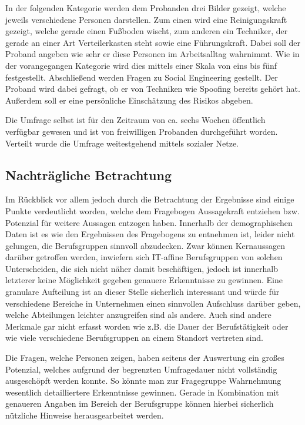 In der folgenden Kategorie werden dem Probanden drei Bilder gezeigt, welche jeweils verschiedene Personen darstellen.
Zum einen wird eine Reinigungskraft gezeigt, welche gerade einen Fußboden wischt, zum anderen ein Techniker, der gerade an einer Art Verteilerkasten steht sowie eine Führungskraft.
Dabei soll der Proband angeben wie sehr er diese Personen im Arbeitsalltag wahrnimmt.
Wie in der vorangegangen Kategorie wird dies mittels einer Skala von eins bis fünf festgestellt.
Abschließend werden Fragen zu Social Engineering gestellt.
Der Proband wird dabei gefragt, ob er von Techniken wie Spoofing bereits gehört hat.
Außerdem soll er eine persönliche Einschätzung des Risikos abgeben.

Die Umfrage selbst ist für den Zeitraum von ca. sechs Wochen öffentlich verfügbar gewesen und ist von freiwilligen Probanden durchgeführt worden.
Verteilt wurde die Umfrage weitestgehend mittels sozialer Netze.


\subsection{Nachträgliche Betrachtung}
Im Rückblick vor allem jedoch durch die Betrachtung der Ergebnisse sind einige Punkte verdeutlicht worden, welche dem Fragebogen Aussagekraft entziehen bzw. Potenzial für weitere Aussagen entzogen haben.
Innerhalb der demographischen Daten ist es wie den Ergebnissen des Fragebogens zu entnehmen ist, leider nicht gelungen, die Berufsgruppen sinnvoll abzudecken.
Zwar können Kernaussagen darüber getroffen werden, inwiefern sich IT-affine Berufsgruppen von solchen Unterscheiden, die sich nicht näher damit beschäftigen, jedoch ist innerhalb letzterer keine Möglichkeit gegeben genauere Erkenntnisse zu gewinnen.
Eine granulare Aufteilung ist an dieser Stelle sicherlich interessant und würde für verschiedene Bereiche in Unternehmen einen sinnvollen Aufschluss darüber geben, welche Abteilungen leichter anzugreifen sind als andere.
Auch sind andere Merkmale gar nicht erfasst worden wie z.B. die Dauer der Berufstätigkeit oder wie viele verschiedene Berufsgruppen an einem Standort vertreten sind. %

Die Fragen, welche Personen zeigen, haben seitens der Auswertung ein großes Potenzial, welches aufgrund der begrenzten Umfragedauer nicht vollständig ausgeschöpft werden konnte.
So könnte man zur Fragegruppe Wahrnehmung wesentlich detailliertere Erkenntnisse gewinnen.
Gerade in Kombination mit genaueren Angaben im Bereich der Berufsgruppe können hierbei sicherlich nützliche Hinweise herausgearbeitet werden.

